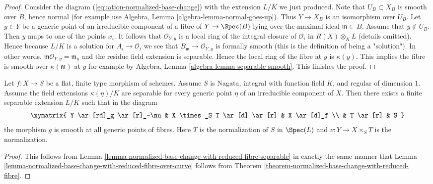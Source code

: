 \begin{proof}
\medskip\noindent
Consider the diagram (\ref{equation-normalized-base-change})
with the extension $L/K$ we just produced. Note that $U_B \subset X_B$
is smooth over $B$, hence normal (for example use
Algebra, Lemma \ref{algebra-lemma-normal-goes-up}).
Thus $Y \to X_B$ is an isomorphism over $U_B$.
Let $y \in Y$ be a generic point of an irreducible
component of a fibre of $Y \to \Spec(B)$ lying over the maximal
ideal $\mathfrak m \subset B$. Assume that $y \not \in U_B$.
Then $y$ maps to one of the points $x_i$. It follows that
$\mathcal{O}_{Y, y}$ is a local ring of the integral closure
of $\mathcal{O}_i$ in $R(X) \otimes_K L$ (details omitted).
Hence because $L/K$ is a solution for
$A_i \to \mathcal{O}_i$ we see that
$B_\mathfrak m \to \mathcal{O}_{Y, y}$ is formally smooth
(this is the definition of being a "solution").
In other words, $\mathfrak m\mathcal{O}_{Y, y} = \mathfrak m_y$
and the residue field extension is separable. Hence the local ring
of the fibre at $y$ is $\kappa(y)$.
This implies the fibre is smooth over $\kappa(\mathfrak m)$
at $y$ for example by Algebra, Lemma \ref{algebra-lemma-separable-smooth}.
This finishes the proof.
\end{proof}

\begin{lemma}
\label{lemma-normalized-base-change-with-reduced-fibre-over-curve-separable}
Let $f : X \to S$ be a flat, finite type morphism of schemes.
Assume $S$ is Nagata, integral with function field $K$, and
regular of dimension $1$. Assume the field extensions $\kappa(\eta)/K$
are separable for every generic point $\eta$ of an irreducible
component of $X$. Then there exists a finite separable extension $L/K$
such that in the diagram
$$
\xymatrix{
Y \ar[rd]_g \ar[r]_-\nu & X \times_S T \ar[d] \ar[r] & X \ar[d]_f \\
& T \ar[r] & S
}
$$
the morphism $g$ is smooth at all generic points of fibres. Here
$T$ is the normalization of $S$ in $\Spec(L)$ and $\nu : Y \to X \times_S T$
is the normalization.
\end{lemma}

\begin{proof}
This follows from
Lemma \ref{lemma-normalized-base-change-with-reduced-fibre-separable}
in exactly the same manner that
Lemma \ref{lemma-normalized-base-change-with-reduced-fibre-over-curve}
follows from
Theorem \ref{theorem-normalized-base-change-with-reduced-fibre}.
\end{proof}








